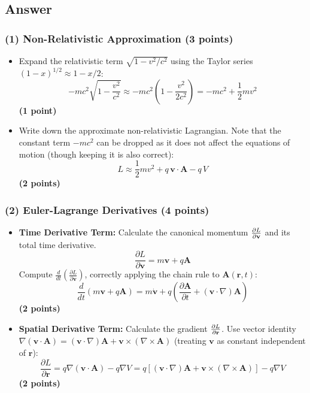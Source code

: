 \documentclass[11pt, a4paper]{article} %
\begin{document}
\subsection*{Answer}
\subsubsection*{(1) Non-Relativistic Approximation (3 points)}
\begin{itemize}
    \item Expand the relativistic term $\sqrt{1 - v^2/c^2}$ using the Taylor series $(1-x)^{1/2} \approx 1 - x/2$:
    \[
    -mc^2\sqrt{1 - \frac{v^2}{c^2}} \approx -mc^2\left(1 - \frac{v^2}{2c^2}\right) = -mc^2 + \frac{1}{2}mv^2
    \]
    \hfill \textbf{(1 point)}
    \item Write down the approximate non-relativistic Lagrangian. Note that the constant term $-mc^2$ can be dropped as it does not affect the equations of motion (though keeping it is also correct):
    \[
    L \approx \frac{1}{2}mv^2 + q\, \mathbf{v} \cdot \mathbf{A} - q\, V
    \]
    \hfill \textbf{(2 points)} \\
\end{itemize}

\subsubsection*{(2) Euler-Lagrange Derivatives (4 points)}
\begin{itemize}
    \item \textbf{Time Derivative Term:}
    Calculate the canonical momentum $\pdv{L}{\mathbf{v}}$ and its total time derivative.
    \[ \frac{\partial L}{\partial \mathbf{v}} = m\mathbf{v} + q\mathbf{A} \]
    Compute $\frac{d}{dt}(\frac{\partial L}{\partial \mathbf{v}})$, correctly applying the chain rule to $\mathbf{A}(\mathbf{r}, t)$:
    \[ \frac{d}{dt}(m\mathbf{v} + q\mathbf{A}) = m\dot{\mathbf{v}} + q\left( \frac{\partial \mathbf{A}}{\partial t} + (\mathbf{v} \cdot \nabla)\mathbf{A} \right) \]
    \hfill \textbf{(2 points)} \\

    \item \textbf{Spatial Derivative Term:}
    Calculate the gradient $\pdv{L}{\mathbf{r}}$. Use vector identity $\nabla(\mathbf{v} \cdot \mathbf{A}) = (\mathbf{v} \cdot \nabla)\mathbf{A} + \mathbf{v} \times (\nabla \times \mathbf{A})$ (treating $\mathbf{v}$ as constant independent of $\mathbf{r}$):
    \[ \frac{\partial L}{\partial \mathbf{r}} = q\nabla(\mathbf{v} \cdot \mathbf{A}) - q\nabla V = q\left[ (\mathbf{v} \cdot \nabla)\mathbf{A} + \mathbf{v} \times (\nabla \times \mathbf{A}) \right] - q\nabla V \]
    \hfill \textbf{(2 points)} \\
\end{itemize}
\end{document}

